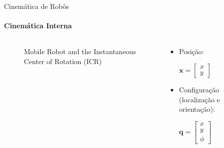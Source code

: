 \documentclass[aspectratio=169]{beamer}
\begin{document}
\begin{frame}{Cinemática de Robôs}
    \framesubtitle{Cinemática Interna}
    \begin{columns}
        \begin{column}[c]{0.5\textwidth}
            \begin{figure}
                
                \caption{Mobile Robot and the Instantaneous Center of Rotation (ICR)}
            \end{figure}
        \end{column}
        \begin{column}[c]{0.5\textwidth}
            \centering
            \begin{itemize}
                \item Posição:
                      \newline

                      $\mathbf{x} = \begin{bmatrix}
                              x \\
                              y
                          \end{bmatrix}$
                      \newline

                \item Configuração (localização e orientação):
                      \newline

                      $\mathbf{q} =
                          \begin{bmatrix}
                              x \\
                              y \\
                              \phi
                          \end{bmatrix}$
            \end{itemize}
        \end{column}
    \end{columns}
\end{frame}
\end{document}
